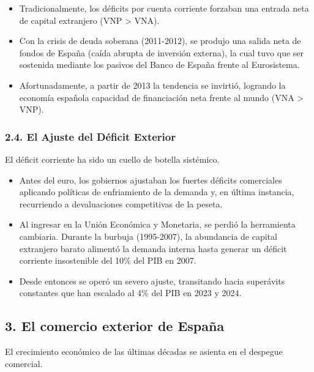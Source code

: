 \begin{itemize}
  \item Tradicionalmente, los déficits por cuenta corriente forzaban una entrada neta de capital extranjero (VNP > VNA).
  \item Con la crisis de deuda soberana (2011-2012), se produjo una salida neta de fondos de España (caída abrupta de inversión externa), la cual tuvo que ser sostenida mediante los pasivos del Banco de España frente al Eurosistema.
  \item Afortunadamente, a partir de 2013 la tendencia se invirtió, logrando la economía española capacidad de financiación neta frente al mundo (VNA > VNP).
\end{itemize}

\subsubsection*{2.4. El Ajuste del Déficit Exterior}

El déficit corriente ha sido un cuello de botella sistémico.

\begin{itemize}
  \item Antes del euro, los gobiernos ajustaban los fuertes déficits comerciales aplicando políticas de enfriamiento de la demanda y, en última instancia, recurriendo a devaluaciones competitivas de la peseta.
  \item Al ingresar en la Unión Económica y Monetaria, se perdió la herramienta cambiaria. Durante la burbuja (1995-2007), la abundancia de capital extranjero barato alimentó la demanda interna hasta generar un déficit corriente insostenible del 10\% del PIB en 2007.
  \item Desde entonces se operó un severo ajuste, transitando hacia superávits constantes que han escalado al 4\% del PIB en 2023 y 2024.
\end{itemize}

\subsection*{3. El comercio exterior de España}

El crecimiento económico de las últimas décadas se asienta en el despegue comercial.

